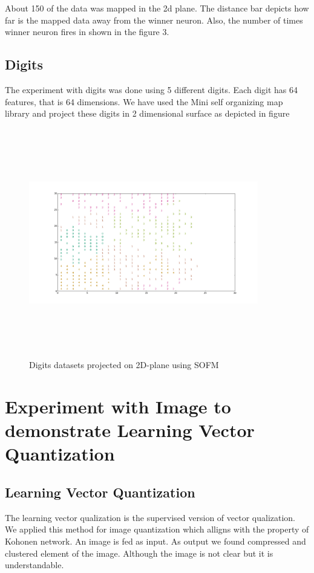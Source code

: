 \documentclass{article}
\begin{document}
About 150 of the data was mapped in the 2d plane. The distance bar depicts how
far is the mapped data away from the winner neuron. Also, the number of times
winner neuron fires in shown in the figure 3.


\subsection{Digits}

The experiment with digits was done using 5 different digits. Each digit has 64
features, that is 64 dimensions. We have used the Mini self organizing map
library and project these digits in 2 dimensional surface as depicted in figure 

\begin{figure}
  \centering
  \includegraphics[height=10cm, width=10cm]{i6.png}
  \caption{Digits datasets projected on 2D-plane using SOFM}
\end{figure}


\section{Experiment with Image to demonstrate Learning Vector Quantization}
\subsection{Learning Vector Quantization}
The learning vector qualization is the supervised version of vector
qualization. We applied this method for image quantization which  alligns
with the property of Kohonen network. An image is fed as input. As output we
found compressed and clustered element of the image. Although the image is not
clear but it is understandable. 
\end{document}
